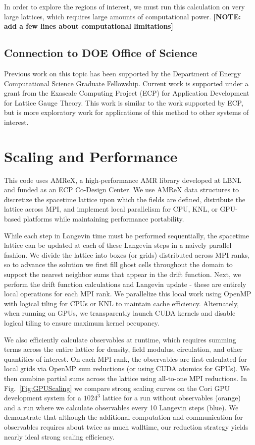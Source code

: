 \documentclass[onecolumn, 12pt]{report}
\newcommand{\note}[1]{{\color{red} \bf[NOTE: #1]}}
\begin{document}
In order to explore the regions of interest, we must run this calculation on very large lattices, which requires large amounts of computational power. \note{add a few lines about computational limitations}

\subsection{Connection to DOE Office of Science}
Previous work on this topic has been supported by the Department of Energy Computational Science Graduate Fellowship. Current work is supported under a grant from the Exascale Computing Project (ECP) for Application Development for Lattice Gauge Theory. This work is similar to the work supported by ECP, but is more exploratory work for applications of this method to other systems of interest.

\section{Scaling and Performance}

This code uses AMReX, a high-performance AMR library developed at LBNL and
funded as an ECP Co-Design Center. We use AMReX data structures to discretize
the spacetime lattice upon which the fields are defined, distribute the lattice
across MPI, and implement local parallelism for CPU, KNL, or GPU-based
platforms while maintaining performance portability.

While each step in Langevin time must be performed sequentially, the spacetime
lattice can be updated at each of these Langevin steps in a naively parallel
fashion. We divide the lattice into boxes (or grids) distributed across MPI
ranks, so to advance the solution we first fill ghost cells throughout the
domain to support the nearest neighbor sums that appear in the drift function.
Next, we perform the drift function calculations and Langevin update - these
are entirely local operations for each MPI rank. We parallelize this local work
using OpenMP with logical tiling for CPUs or KNL to maintain cache efficiency.
Alternately, when running on GPUs, we transparently launch CUDA kernels and
disable logical tiling to ensure maximum kernel occupancy.

We also efficiently calculate observables at runtime, which requires summing
terms across the entire lattice for density, field modulus, circulation, and
other quantities of interest. On each MPI rank, the observables are first
calculated for local grids via OpenMP sum reductions (or using CUDA atomics for
GPUs). We then combine partial sums across the lattice using all-to-one MPI
reductions. In Fig.~\ref{Fig:GPUScaling} we compare strong scaling curves on
the Cori GPU development system for a $1024^3$ lattice for a run without
observables (orange) and a run where we calculate observables every 10 Langevin
steps (blue). We demonstrate that although the additional computation and
communication for observables requires about twice as much walltime, our
reduction strategy yields nearly ideal strong scaling efficiency.
\end{document}
